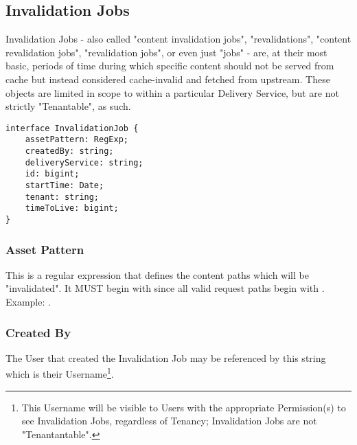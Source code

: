 %
%

\subsection{Invalidation Jobs}
Invalidation Jobs - also called "content invalidation jobs", "revalidations",
"content revalidation jobs", "revalidation jobs", or even just "jobs" - are, at
their most basic, periods of time during which specific content should not be
served from cache but instead considered cache-invalid and fetched from
upstream. These objects are limited in scope to within a particular Delivery
Service, but are not strictly "Tenantable", as such.

\begin{codelisting}
\label{code:datamodel:invalidation-job}
\begin{verbatim}
interface InvalidationJob {
	assetPattern: RegExp;
	createdBy: string;
	deliveryService: string;
	id: bigint;
	startTime: Date;
	tenant: string;
	timeToLive: bigint;
}
\end{verbatim}
\end{codelisting}

\subsubsection{Asset Pattern}
This is a regular expression that defines the content paths which will be
"invalidated". It MUST begin with \code{/} since all valid request paths begin
with \code{/}. Example: .

\subsubsection{Created By}
The User that created the Invalidation Job may be referenced by this string
which is their Username\footnote{This Username will be visible to Users with the
appropriate Permission(s) to see Invalidation Jobs, regardless of Tenancy;
Invalidation Jobs are not "Tenantantable".}.

